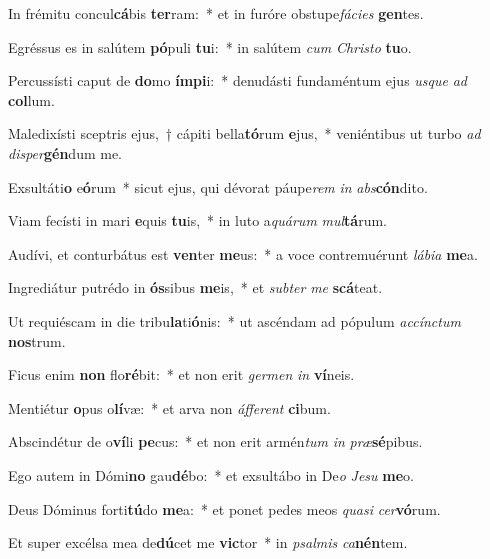 \item In frémitu concul\textbf{cá}bis \textbf{ter}ram:~* et in furóre obstupe\textit{fá}\textit{ci}\textit{es} \textbf{gen}tes.
\item Egréssus es in salútem \textbf{pó}puli \textbf{tu}i:~* in salútem \textit{cum} \textit{Chris}\textit{to} \textbf{tu}o.
\item Percussísti caput de \textbf{do}mo \textbf{ím}\textbf{pi}i:~* denudásti fundaméntum ejus \textit{us}\textit{que} \textit{ad} \textbf{col}lum.
\item Maledixísti sceptris ejus,~† cápiti bella\textbf{tó}rum \textbf{e}jus,~* veniéntibus ut turbo \textit{ad} \textit{di}\textit{sper}\textbf{gén}dum me.
\item Exsultáti\textbf{o} e\textbf{ó}rum~* sicut ejus, qui dévorat páupe\textit{rem} \textit{in} \textit{abs}\textbf{cón}dito.
\item Viam fecísti in mari \textbf{e}quis \textbf{tu}is,~* in luto a\textit{quá}\textit{rum} \textit{mul}\textbf{tá}rum.
\item Audívi, et conturbátus est \textbf{ven}ter \textbf{me}us:~* a voce contremuérunt \textit{lá}\textit{bi}\textit{a} \textbf{me}a.
\item Ingrediátur putrédo in \textbf{ós}sibus \textbf{me}is,~* et \textit{sub}\textit{ter} \textit{me} \textbf{scá}teat.
\item Ut requiéscam in die tribu\textbf{la}ti\textbf{ó}nis:~* ut ascéndam ad pópulum \textit{ac}\textit{cínc}\textit{tum} \textbf{nos}trum.
\item Ficus enim \textbf{non} flo\textbf{ré}bit:~* et non erit \textit{ger}\textit{men} \textit{in} \textbf{ví}neis.
\item Mentiétur \textbf{o}pus o\textbf{lí}væ:~* et arva non \textit{áf}\textit{fe}\textit{rent} \textbf{ci}bum.
\item Abscindétur de o\textbf{ví}li \textbf{pe}cus:~* et non erit armén\textit{tum} \textit{in} \textit{præ}\textbf{sé}pibus.
\item Ego autem in Dómi\textbf{no} gau\textbf{dé}bo:~* et exsultábo in De\textit{o} \textit{Je}\textit{su} \textbf{me}o.
\item Deus Dóminus forti\textbf{tú}do \textbf{me}a:~* et ponet pedes meos \textit{qua}\textit{si} \textit{cer}\textbf{vó}rum.
\item Et super excélsa mea de\textbf{dú}cet me \textbf{vic}tor~* in \textit{psal}\textit{mis} \textit{ca}\textbf{nén}tem.
